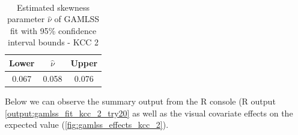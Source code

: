 \begin{table}[H]
\setlength\arrayrulewidth{1pt}  
\centering
\begin{adjustbox}{max width=\textwidth}\
\begin{tabular}{|c|c|c|}
\hline
\rowcolor{lightgray} 
Lower & $\hat{\nu}$ & Upper \\ \hline
0.067        & 0.058           & 0.076        \\ \hline
\end{tabular}
\end{adjustbox}
\caption{Estimated skewness parameter $\hat{\nu}$ of GAMLSS fit with 95\% confidence interval bounds - KCC 2}
\label{tab:nu_ci_kcc_2}
\end{table}






Below we can observe the summary output from the R console (R output \ref{output:gamlss_fit_kcc_2_try20} as well as the visual covariate effects on the expected value (\autoref{fig:gamlss_effects_kcc_2}).
\\








